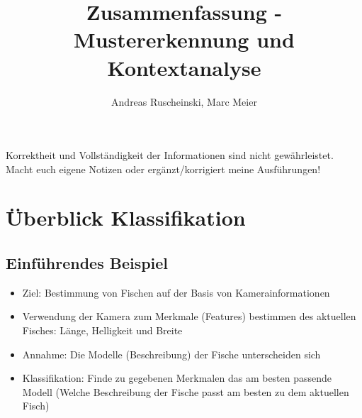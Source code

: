 \documentclass{article} %
\title{Zusammenfassung - Mustererkennung und Kontextanalyse}
\author{
	Andreas Ruscheinski,
	Marc Meier
}
\begin{document}
\maketitle
\begin{framed}Korrektheit und Vollständigkeit der Informationen sind nicht gewährleistet.
Macht euch eigene Notizen oder ergänzt/korrigiert meine Ausführungen!
\end{framed}
\setcounter{tocdepth}{1}
\tableofcontents

\section{Überblick Klassifikation}
	\subsection{Einführendes Beispiel}
	\begin{itemize}
		\item Ziel: Bestimmung von Fischen auf der Basis von Kamerainformationen
		\item Verwendung der Kamera zum Merkmale (Features) bestimmen des aktuellen Fisches: Länge, Helligkeit und Breite
		\item Annahme: Die Modelle (Beschreibung) der Fische unterscheiden sich
		\item Klassifikation: Finde zu gegebenen Merkmalen das am besten passende Modell (Welche Beschreibung der Fische passt am besten zu dem aktuellen Fisch)
	\end{itemize}
\end{document}
